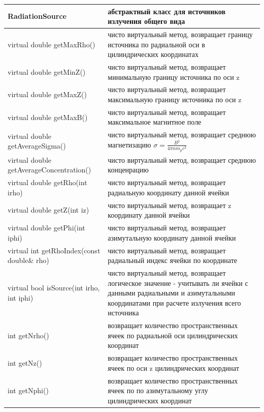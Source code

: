 \begin{small}
	\label{sourceMethods1}
	\begin{xtabular}{|p{0.5\textwidth}|p{0.5\textwidth}|}
		\hline
		\textbf{RadiationSource} & абстрактный класс для источников излучения общего вида\\
		\hline
		virtual double getMaxRho() & чисто виртуальный метод, возвращает границу источника по радиальной оси в цилиндрических координатах\\
		\hline
		virtual double getMinZ() & чисто виртуальный метод, возвращает минимальную границу источника по оси z\\
		\hline
		virtual double getMaxZ() & чисто виртуальный метод, возвращает максимальную границу источника по оси z\\
		\hline
		virtual double getMaxB() & чисто виртуальный метод, возвращает максимальное магнитное поле\\
		\hline
		virtual double getAverageSigma() & чисто виртуальный метод, возвращает среднюю магнетизацию $\sigma=\frac{B^2}{4\pi n m_p c^2}$\\
		\hline
		virtual double getAverageConcentration() &чисто виртуальный метод, возвращает среднюю конценрацию\\
		\hline
		virtual double getRho(int irho) & чисто виртуальный метод, возвращает радиальную координату данной ячейки\\
		\hline
		virtual double getZ(int iz)& чисто виртуальный метод, возвращает z координату данной ячейки\\
		\hline
		virtual double getPhi(int iphi)& чисто виртуальный метод, возвращает азимутальную координату данной ячейки\\
		\hline
		virtual int getRhoIndex(const double\& rho)& чисто виртуальный метод, возвращает радиальный индекс ячейки по координате\\
		\hline
		virtual bool isSource(int irho, int iphi)& чисто виртуальный метод, возвращает логическое значение - учитывать ли ячейки с данными радиальными и азимутальными координатами при расчете излучения всего источника\\
		\hline
		int getNrho() & возвращает количество пространственных ячеек по радиальной оси цилиндрических координат\\
		\hline
		int getNz() & возвращает количество пространственных ячеек по оси z цилиндрических координат\\
		\hline
		int getNphi() & возвращает количество пространственных ячеек по по азимутальному углу цилиндрических координат\\

\end{xtabular}
\end{small}
